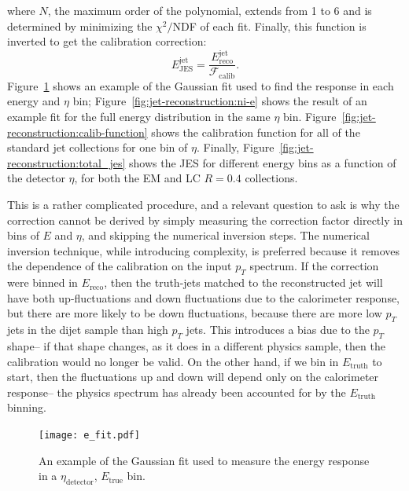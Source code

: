 %
where $N$, the maximum order of the polynomial, extends from 1 to 6 and is determined by minimizing the $\chi^2/$NDF of each fit. Finally, this function is inverted to get the calibration correction:
%
\begin{equation}
E^{\mathrm{jet}}_{\mathrm{JES}} = \frac{E^{\mathrm{jet}}_{\mathrm{reco}}}{\mathcal{F}_\mathrm{calib}}.
\end{equation}
%
Figure~\ref{fig:jet-reconstruction:e-fit} shows an example of the Gaussian fit used to find the response in each energy and $\eta$ bin; Figure~\ref{fig:jet-reconstruction:ni-e} shows the result of an example fit for the full energy distribution in the same $\eta$ bin. Figure~\ref{fig:jet-reconstruction:calib-function} shows the calibration function for all of the standard jet collections for one bin of $\eta$. Finally, Figure~\ref{fig:jet-reconstruction:total_jes} shows the JES for different energy bins as a function of the detector $\eta$, for both the EM and LC $R=0.4$ collections.

This is a rather complicated procedure, and a relevant question to ask is why the correction cannot be derived by simply measuring the correction factor directly in bins of $E$ and $\eta$, and skipping the numerical inversion steps. The numerical inversion technique, while introducing complexity, is preferred because it removes the dependence of the calibration on the input $p_T$ spectrum. If the correction were binned in $E_{\mathrm{reco}}$, then the truth-jets matched to the reconstructed jet will have both up-fluctuations and down fluctuations due to the calorimeter response, but there are more likely to be down fluctuations, because there are more low $p_T$ jets in the dijet sample than high $p_T$ jets. This introduces a bias due to the $p_T$ shape-- if that shape changes, as it does in a different physics sample, then the calibration would no longer be valid. On the other hand, if we bin in $E_{\mathrm{truth}}$ to start, then the fluctuations up and down will depend only on the calorimeter response-- the physics spectrum has already been accounted for by the $E_{\mathrm{truth}}$ binning.



\begin{figure}
\centering
\texttt{[image: e\_fit.pdf]}
\label{fig:jet-reconstruction:e-fit}
\caption{An example of the Gaussian fit used to measure the energy response in a $\eta_\mathrm{detector}$, $E_\mathrm{true}$ bin.}
\end{figure}


